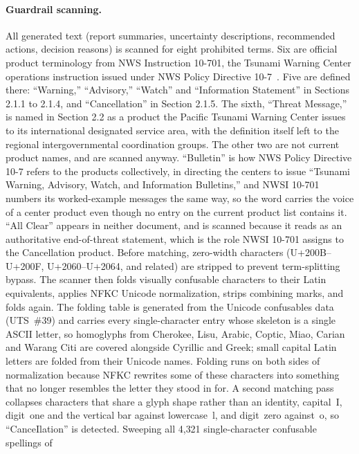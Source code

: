 \documentclass{article}
\begin{document}
\paragraph{Guardrail scanning.}
All generated text (report summaries, uncertainty descriptions,
recommended actions, decision reasons) is scanned for eight prohibited
terms.  Six are official product terminology from NWS Instruction
10-701, the Tsunami Warning Center operations instruction issued under
NWS Policy Directive 10-7~\citep{nwsi10701,nwspd107}.  Five are defined
there: ``Warning,'' ``Advisory,'' ``Watch'' and ``Information
Statement'' in Sections 2.1.1 to 2.1.4, and ``Cancellation'' in
Section 2.1.5.  The sixth, ``Threat Message,'' is named in Section 2.2
as a product the Pacific Tsunami Warning Center issues to its
international designated service area, with the definition itself left
to the regional intergovernmental coordination groups.  The other two
are not current product names, and are scanned anyway.  ``Bulletin'' is
how NWS Policy Directive 10-7 refers to the products collectively, in
directing the centers to issue ``Tsunami Warning, Advisory, Watch, and
Information Bulletins,'' and NWSI 10-701 numbers its worked-example
messages the same way, so the word carries the voice of a center
product even though no entry on the current product list contains it.
``All Clear'' appears in neither document, and is scanned
because it reads as an authoritative end-of-threat statement, which is
the role NWSI 10-701 assigns to the Cancellation product.
Before matching,
zero-width characters (U+200B--U+200F, U+2060--U+2064, and related)
are stripped to prevent term-splitting bypass.  The scanner then folds
visually confusable characters to their Latin equivalents, applies NFKC
Unicode normalization, strips combining marks, and folds again.  The
folding table is generated from the Unicode confusables data (UTS~\#39)
and carries every single-character entry whose skeleton is a single
ASCII letter, so homoglyphs from Cherokee, Lisu, Arabic, Coptic, Miao,
Carian and Warang Citi are covered alongside Cyrillic and Greek; small
capital Latin letters are folded from their Unicode names.  Folding runs
on both sides of normalization because NFKC rewrites some of these
characters into something that no longer resembles the letter they stood
in for.  A second matching pass collapses characters that share a glyph
shape rather than an identity, capital~I, digit~one and the vertical bar
against lowercase~l, and digit~zero against~o, so ``CanceIlation'' is
detected.  Sweeping all 4{,}321 single-character confusable spellings of
\end{document}
